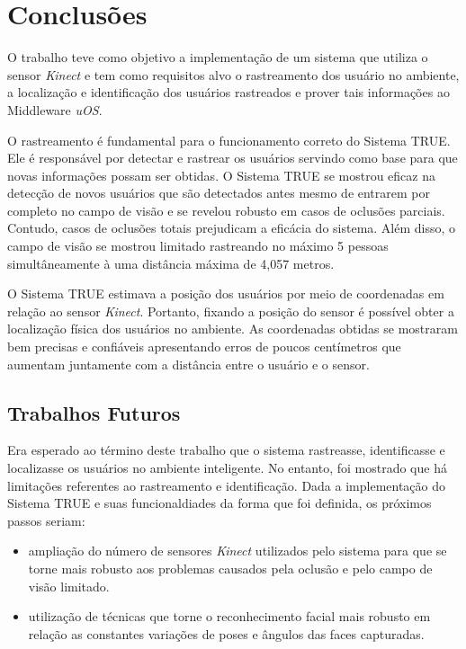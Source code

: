 \chapter{Conclusões}
\label{cap:conclusao}

O trabalho teve como objetivo a implementação de um sistema que utiliza o sensor \textit{Kinect} e tem como requisitos alvo o rastreamento dos usuário no ambiente, a localização e identificação dos usuários rastreados e prover tais informações ao Middleware \textit{uOS}.

O rastreamento é fundamental para o funcionamento correto do Sistema TRUE. Ele é responsável por detectar e rastrear os usuários servindo como base para que novas informações possam ser obtidas. O Sistema TRUE se mostrou eficaz na detecção de novos usuários que são detectados antes mesmo de entrarem por completo no campo de visão e se revelou robusto em casos de oclusões parciais. Contudo, casos de oclusões totais prejudicam a eficácia do sistema. Além disso, o campo de visão se mostrou limitado rastreando no máximo 5 pessoas simultâneamente à uma distância máxima de 4,057 metros.

O Sistema TRUE estimava a posição dos usuários por meio de coordenadas em relação ao sensor \textit{Kinect}. Portanto, fixando a posição do sensor é possível obter a localização física dos usuários no ambiente. As coordenadas obtidas se mostraram bem precisas e confiáveis apresentando erros de poucos centímetros que aumentam juntamente com a distância entre o usuário e o sensor. 




\section{Trabalhos Futuros}

Era esperado ao término deste trabalho que o sistema rastreasse, identificasse e localizasse os usuários no ambiente inteligente. No entanto, foi mostrado que há limitações referentes ao rastreamento e identificação. Dada a implementação do Sistema TRUE e suas funcionaldiades da forma que foi definida, os próximos passos seriam:

\begin{itemize}
	\item ampliação do número de sensores \textit{Kinect} utilizados pelo sistema para que se torne mais robusto aos problemas causados pela oclusão e pelo campo de visão limitado.
	\item utilização de técnicas que torne o reconhecimento facial mais robusto em relação as constantes variações de poses e ângulos das faces capturadas.
\end{itemize}




